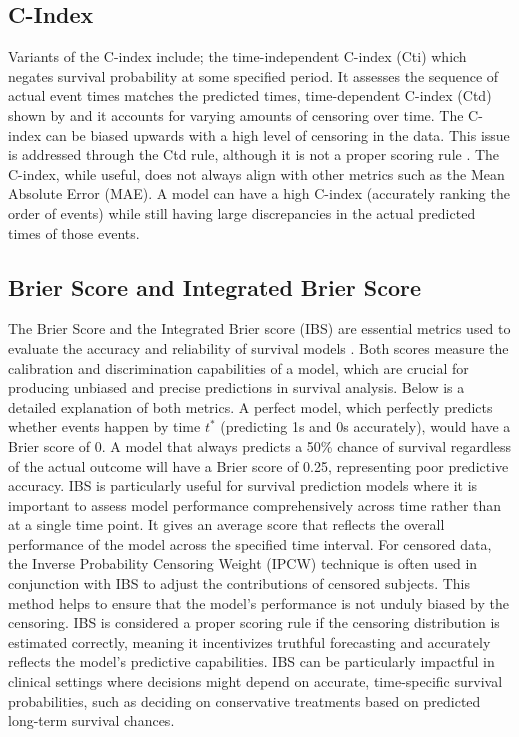 \subsection{C-Index}
\noindent Variants of the C-index include; the time-independent C-index (Cti) which negates survival probability at some specified period. It assesses the sequence of actual event times matches the predicted times, time-dependent C-index (Ctd) shown by \parencite{qi_effective_2023} and it accounts for varying amounts of censoring over time. The C-index can be biased upwards with a high level of censoring in the data. This issue is addressed through the Ctd rule, although it is not a proper scoring rule \parencite{qi_effective_2023}. The C-index, while useful, does not always align with other metrics such as the Mean Absolute Error (MAE). A model can have a high C-index (accurately ranking the order of events) while still having large discrepancies in the actual predicted times of those events.

\subsection{Brier Score and Integrated Brier Score}
The Brier Score and the Integrated Brier score (IBS) are essential metrics used to evaluate the accuracy and reliability of survival models \parencite{haider_effective_2018}. Both scores measure the calibration and discrimination capabilities of a model, which are crucial for producing unbiased and precise predictions in survival analysis. Below is a detailed explanation of both metrics. A perfect model, which perfectly predicts whether events happen by time \(t^{*}\) (predicting 1s and 0s accurately), would have a Brier score of 0. A model that always predicts a 50\% chance of survival regardless of the actual outcome will have a Brier score of 0.25, representing poor predictive accuracy. IBS is particularly useful for survival prediction models where it is important to assess model performance comprehensively across time rather than at a single time point. It gives an average score that reflects the overall performance of the model across the specified time interval. For censored data, the Inverse Probability Censoring Weight (IPCW) \parencite{haider_effective_2018} technique is often used in conjunction with IBS to adjust the contributions of censored subjects. This method helps to ensure that the model's performance is not unduly biased by the censoring. IBS is considered a proper scoring rule if the censoring distribution is estimated correctly, meaning it incentivizes truthful forecasting and accurately reflects the model's predictive capabilities. IBS can be particularly impactful in clinical settings where decisions might depend on accurate, time-specific survival probabilities, such as deciding on conservative treatments based on predicted long-term survival chances.

